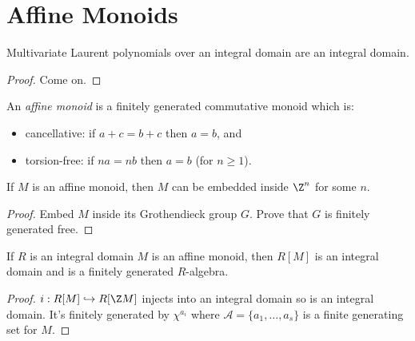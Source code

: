 \section{Affine Monoids}


\begin{lemma}
  \label{0-mv-laurent-poly-domain}
  \uses{}
  \leanok

  Multivariate Laurent polynomials over an integral domain are an integral domain.
\end{lemma}
\begin{proof}
  \uses{}
  \leanok

  Come on.
\end{proof}


\begin{definition}
  \label{0-aff-mon}
  \leanok

  An \emph{affine monoid} is a finitely generated commutative monoid which is:
  \begin{itemize}
    \item cancellative: if $a + c = b + c$ then $a = b$, and
    \item torsion-free: if $n a = n b$ then $a = b$ (for $n \geq 1$).
  \end{itemize}
\end{definition}


\begin{proposition}
  \label{0-embed-aff-mon}
  \leanok

  If $M$ is an affine monoid, then $M$ can be embedded inside $\Z^n$ for some $n$.
\end{proposition}
\begin{proof}
  \uses{}
  \leanok

  Embed $M$ inside its Grothendieck group $G$. Prove that $G$ is finitely generated free.
\end{proof}


\begin{proposition}
  \label{0-aff-mon-alg-domain}
  \leanok

  If $R$ is an integral domain $M$ is an affine monoid, then $R[M]$ is an integral domain and is a finitely generated $R$-algebra.
\end{proposition}
\begin{proof}
  \leanok

  $i : R[M] \hookrightarrow R[\Z M]$ injects into an integral domain so is an integral domain. It's finitely generated by $\chi^{a_i}$ where $\mathcal A = \{a_1, \dotsc, a_s\}$ is a finite generating set for $M$.
\end{proof}


